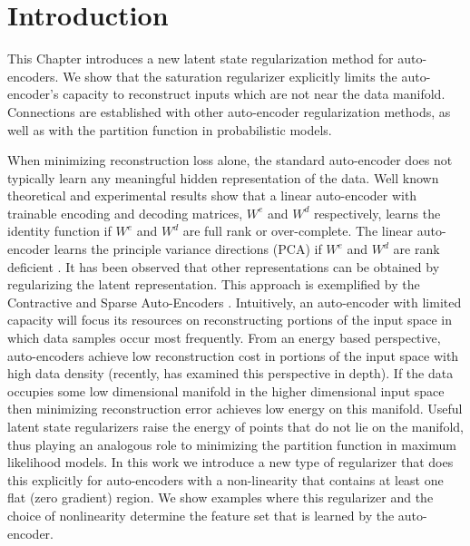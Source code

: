 \section{Introduction} 
This Chapter introduces a new latent state regularization method for auto-encoders. 
We show that the saturation regularizer explicitly limits the auto-encoder's capacity to
reconstruct inputs which are not near the data manifold. Connections are established with 
other auto-encoder regularization methods, as well as with the partition function in 
probabilistic models. 

When minimizing reconstruction loss alone, the standard auto-encoder
does not typically learn any meaningful hidden representation of the data. Well
known theoretical and experimental results show that a linear auto-encoder with
trainable encoding and decoding matrices, $W^e$ and $W^d$ respectively, learns
the identity function if $W^e$ and $W^d$ are full rank or over-complete. The
linear auto-encoder learns the principle variance directions (PCA) if $W^e$ and
$W^d$ are rank deficient \cite{DHS}. It has been observed that other
representations can be obtained by regularizing the latent representation. This
approach is exemplified by the Contractive and Sparse Auto-Encoders \cite{CAE}
\cite{SAE1} \cite{SAE2}. Intuitively, an auto-encoder with limited capacity
will focus its resources on reconstructing portions of the input space in which
data samples occur most frequently. From an energy based perspective,
auto-encoders achieve low reconstruction cost in portions of the input space
with high data density (recently, \cite{bengio_new} has examined this
perspective in depth). If the data occupies some low dimensional manifold in
the higher dimensional input space then minimizing reconstruction error
achieves low energy on this manifold. Useful latent state regularizers raise
the energy of points that do not lie on the manifold, thus playing an analogous
role to minimizing the partition function in maximum likelihood models. In this
work we introduce a new type of regularizer that does this explicitly for
auto-encoders with a non-linearity that contains at least one flat (zero
gradient) region. We show examples where this regularizer and the choice of
nonlinearity determine the feature set that is learned by the auto-encoder.      

